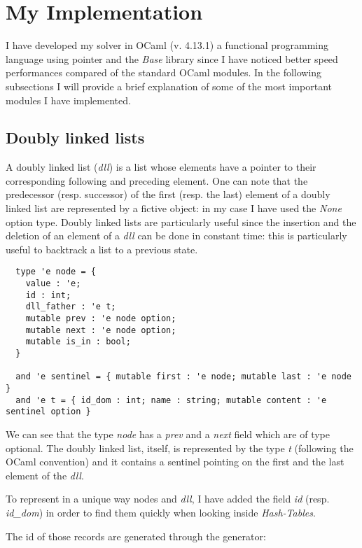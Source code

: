 \documentclass{rapport}
\begin{document}
\section{My Implementation}

I have developed my solver in OCaml (v. 4.13.1) a functional programming language using pointer and the \textit{Base} library since I have noticed better speed performances compared of the standard OCaml modules. In the following subsections I will provide a brief explanation of some of the most important modules I have implemented.

\subsection{Doubly linked lists}

A doubly linked list (\textit{dll}) is a list whose elements have a pointer to their corresponding following and preceding element. One can note that the predecessor (resp. successor) of the first (resp. the last) element of a doubly linked list are represented by a fictive object: in my case I have used the \textit{None} option type. Doubly linked lists are particularly useful since the insertion and the deletion of an element of a \textit{dll} can be done in constant time: this is particularly useful to backtrack a list to a previous state.

\begin{verbatim}
  type 'e node = {
    value : 'e;
    id : int;
    dll_father : 'e t;
    mutable prev : 'e node option;
    mutable next : 'e node option;
    mutable is_in : bool;
  }
  
  and 'e sentinel = { mutable first : 'e node; mutable last : 'e node }
  and 'e t = { id_dom : int; name : string; mutable content : 'e sentinel option }
\end{verbatim}

We can see that the type \textit{node} has a \textit{prev} and a \textit{next} field which are of type optional. The doubly linked list, itself, is represented by the type \textit{t} (following the OCaml convention) and it contains a sentinel pointing on the first and the last element of the \textit{dll}.

To represent in a unique way nodes and \textit{dll}, I have added the field \textit{id} (resp. \textit{id\_dom}) in order to find them quickly when looking inside \textit{Hash-Tables}.

The id of those records are generated through the generator:
\end{document}
